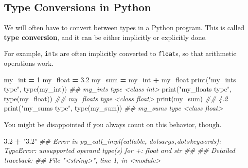 \documentclass[
  12pt,
]{krantz}
\makeatletter
\newenvironment{Shaded}{\begin{snugshade}}{\end{snugshade}}
\newcommand{\BuiltInTok}[1]{#1}
\newcommand{\CommentTok}[1]{\textcolor[rgb]{0.37,0.37,0.37}{\textit{#1}}}
\newcommand{\DecValTok}[1]{\textcolor[rgb]{0.06,0.06,0.06}{#1}}
\newcommand{\FloatTok}[1]{\textcolor[rgb]{0.06,0.06,0.06}{#1}}
\newcommand{\NormalTok}[1]{#1}
\newcommand{\OperatorTok}[1]{\textcolor[rgb]{0.43,0.43,0.43}{\textbf{#1}}}
\newcommand{\StringTok}[1]{\textcolor[rgb]{0.5,0.5,0.5}{#1}}
\newenvironment{kframe}{%
\medskip{}
\setlength{\fboxsep}{.8em}
 \def\at@end@of@kframe{}%
 \ifinner\ifhmode%
  \def\at@end@of@kframe{\end{minipage}}%
  \begin{minipage}{\columnwidth}%
 \fi\fi%
 \def\FrameCommand##1{\hskip\@totalleftmargin \hskip-\fboxsep
 \colorbox{shadecolor}{##1}\hskip-\fboxsep
     \hskip-\linewidth \hskip-\@totalleftmargin \hskip\columnwidth}%
 \MakeFramed {\advance\hsize-\width
   \@totalleftmargin\z@ \linewidth\hsize
   \@setminipage}}%
 {\par\unskip\endMakeFramed%
 \at@end@of@kframe}
\renewenvironment{Shaded}{\begin{kframe}}{\end{kframe}}
\makeatother
\begin{document}
\hypertarget{type-conversions-in-python}{%
\subsection{Type Conversions in Python}\label{type-conversions-in-python}}

We will often have to convert between types in a Python program. This is called \textbf{type conversion}, and it can be either implicitly or explicitly done.

For example, \texttt{int}s are often implicitly converted to \texttt{float}s, so that arithmetic operations work.

\begin{Shaded}
\begin{Highlighting}[]
\NormalTok{my\_int }\OperatorTok{=} \DecValTok{1}
\NormalTok{my\_float }\OperatorTok{=} \FloatTok{3.2}
\NormalTok{my\_sum }\OperatorTok{=}\NormalTok{ my\_int }\OperatorTok{+}\NormalTok{ my\_float}
\BuiltInTok{print}\NormalTok{(}\StringTok{"my\_int\textquotesingle{}s type"}\NormalTok{, }\BuiltInTok{type}\NormalTok{(my\_int))}
\CommentTok{\#\# my\_int\textquotesingle{}s type \textless{}class \textquotesingle{}int\textquotesingle{}\textgreater{}}
\BuiltInTok{print}\NormalTok{(}\StringTok{"my\_float\textquotesingle{}s type"}\NormalTok{, }\BuiltInTok{type}\NormalTok{(my\_float))}
\CommentTok{\#\# my\_float\textquotesingle{}s type \textless{}class \textquotesingle{}float\textquotesingle{}\textgreater{}}
\BuiltInTok{print}\NormalTok{(my\_sum)}
\CommentTok{\#\# 4.2}
\BuiltInTok{print}\NormalTok{(}\StringTok{"my\_sum\textquotesingle{}s type"}\NormalTok{, }\BuiltInTok{type}\NormalTok{(my\_sum))}
\CommentTok{\#\# my\_sum\textquotesingle{}s type \textless{}class \textquotesingle{}float\textquotesingle{}\textgreater{}}
\end{Highlighting}
\end{Shaded}

You might be disappointed if you always count on this behavior, though.

\begin{Shaded}
\begin{Highlighting}[]
\FloatTok{3.2} \OperatorTok{+} \StringTok{"3.2"}
\CommentTok{\#\# Error in py\_call\_impl(callable, dots$args, dots$keywords): TypeError: unsupported operand type(s) for +: \textquotesingle{}float\textquotesingle{} and \textquotesingle{}str\textquotesingle{}}
\CommentTok{\#\# }
\CommentTok{\#\# Detailed traceback:}
\CommentTok{\#\#   File "\textless{}string\textgreater{}", line 1, in \textless{}module\textgreater{}}
\end{Highlighting}
\end{Shaded}
\end{document}
